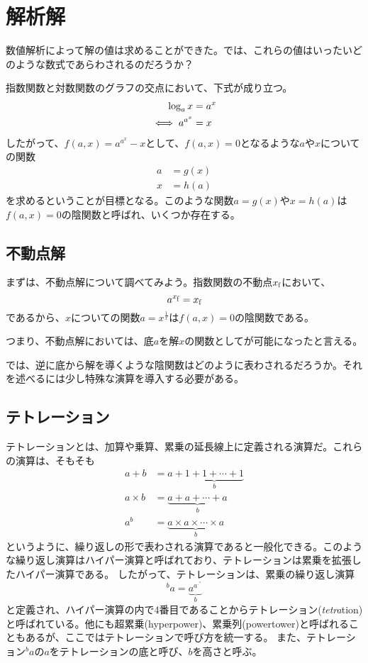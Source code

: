 \section{解析解}

	数値解析によって解の値は求めることができた。では、これらの値はいったいどのような数式であらわされるのだろうか？

	指数関数と対数関数のグラフの交点において、下式が成り立つ。
	\begin{align*}
		\log_{a} x &= a^x \\
	\iff a^{a^x}&= x
	\end{align*}
	したがって、$f(a,x) = a^{a^x} - x$として、$f(a,x) = 0$となるような$a$や$x$についての関数
	\begin{align*}
			 a &= g(x) \\
			 x &= h(a) 
	\end{align*}
	を求めるということが目標となる。このような関数$a = g(x)$や$x = h(a)$は$f(a,x) = 0$の陰関数と呼ばれ、いくつか存在する。

\subsection{不動点解}
	まずは、不動点解について調べてみよう。指数関数の不動点$\xf$において、
	\begin{equation*}
		a^{\xf} = \xf
	\end{equation*}
	であるから、$x$についての関数$a = x^{\frac{1}{x}}$は$f(a,x) = 0$の陰関数である。
	
	つまり、不動点解においては、底$a$を解$x$の関数としてが可能になったと言える。
	
	では、逆に底から解を導くような陰関数はどのように表わされるだろうか。それを述べるには少し特殊な演算を導入する必要がある。
	
\subsection{テトレーション}
	テトレーションとは、加算や乗算、累乗の延長線上に定義される演算だ。これらの演算は、そもそも
	\begin{align*}
		a + b &= a +  \underbrace{1 + 1 + \cdots + 1}_b \\
		a \times b &= \underbrace{a + a + \cdots + a}_b \\
		a^b   &= \underbrace{a \times a \times \cdots \times a}_b
	\end{align*}
	というように、繰り返しの形で表わされる演算であると一般化できる。このような繰り返し演算はハイパー演算と呼ばれており、テトレーションは累乗を拡張したハイパー演算である。
	したがって、テトレーションは、累乗の繰り返し演算
	\begin{equation*}
		^b a = \underbrace{a ^{a ^{\cdot ^{\cdot ^a}}}}_b
	\end{equation*}
	と定義され、ハイパー演算の内で4番目であることからテトレーション(\emph{tetra}tion)と呼ばれている。他にも超累乗(hyperpower)、累乗列(powertower)と呼ばれることもあるが、ここではテトレーションで呼び方を統一する。
	また、テトレーション$^b a$の$a$をテトレーションの底と呼び、$b$を高さと呼ぶ。
	
